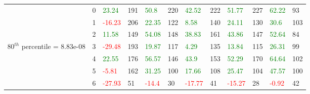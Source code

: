 \begin{table}[htb!]
\begin{adjustwidth}{-0.9in}{-0.9in}
\begin{tabular}{|p{5em}|p{2em}|p{3em}|p{3em}|p{3em}|p{3em}|p{3em}|p{3em}|p{3em}|p{3em}|p{3em}|p{3em}|}
            & 0 & \textcolor{green}{23.24} & 191 & \textcolor{green}{50.8} & 220 & \textcolor{green}{42.52} & 222 & \textcolor{green}{51.77} & 227 & \textcolor{green}{62.22} & 93\\\cline{3-12}
            & 1 & \textcolor{red}{-16.23} & 206 & \textcolor{green}{22.35} & 122 & \textcolor{green}{8.58} & 140 & \textcolor{green}{24.11} & 130 & \textcolor{green}{30.6} & 103\\\cline{3-12}
            & 2 & \textcolor{green}{11.58} & 149 & \textcolor{green}{54.08} & 148 & \textcolor{green}{38.83} & 161 & \textcolor{green}{43.86} & 147 & \textcolor{green}{52.64} & 84\\\cline{3-12}
            $80^{th}$ percentile = 8.83e-08 & 3 & \textcolor{red}{-29.48} & 193 & \textcolor{green}{19.87} & 117 & \textcolor{green}{4.29} & 135 & \textcolor{green}{13.84} & 115 & \textcolor{green}{26.31} & 99\\[-5.5ex]\cline{3-12}
            & 4 & \textcolor{green}{22.55} & 176 & \textcolor{green}{56.57} & 146 & \textcolor{green}{43.9} & 153 & \textcolor{green}{52.29} & 170 & \textcolor{green}{64.64} & 102\\\cline{3-12}
            & 5 & \textcolor{red}{-5.81} & 162 & \textcolor{green}{31.25} & 100 & \textcolor{green}{17.66} & 108 & \textcolor{green}{25.47} & 104 & \textcolor{green}{47.57} & 100\\\cline{3-12}
            & 6 & \textcolor{red}{-27.93} & 51 & \textcolor{red}{-14.4} & 30 & \textcolor{red}{-17.77} & 41 & \textcolor{red}{-15.27} & 28 & \textcolor{red}{-0.92} & 42\\\hline\hline


\end{tabular}
\end{adjustwidth}
\end{table}

